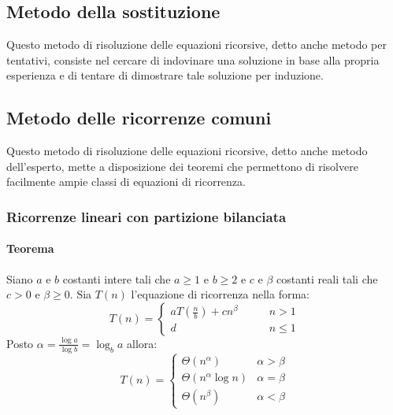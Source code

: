 \subsection{Metodo della sostituzione}
Questo metodo di risoluzione delle equazioni ricorsive, detto anche metodo per tentativi, consiste nel cercare di indovinare una soluzione in base alla 
propria esperienza e di tentare di dimostrare tale soluzione per induzione.
\subsection{Metodo delle ricorrenze comuni}
Questo metodo di risoluzione delle equazioni ricorsive, detto anche metodo dell'esperto, mette a disposizione dei teoremi che permettono di risolvere 
facilmente ampie classi di equazioni di ricorrenza.
\subsubsection{Ricorrenze lineari con partizione bilanciata}
\paragraph{Teorema}
Siano $a$ e $b$ costanti intere tali che $a\ge 1$ e $b\ge 2$ e $c$ e $\beta$ costanti reali tali che $c>0$ e $\beta\ge 0$. Sia $T(n)$ l'equazione di 
ricorrenza nella forma:
\begin{equation*}
T(n)=
\begin{cases}
aT(\frac{n}{b})+cn^\beta\quad\quad & n>1\\
d & n\le 1
\end{cases}
\end{equation*}
Posto $\alpha=\frac{\log a}{\log b}=\log_b a$ allora:
\begin{equation*}
T(n)=
\begin{cases}
\Theta(n^\alpha) \quad\quad & \alpha>\beta\\ 
\Theta(n^\alpha\log n) & \alpha=\beta\\ 
\Theta(n^\beta) & \alpha<\beta
\end{cases}
\end{equation*}
